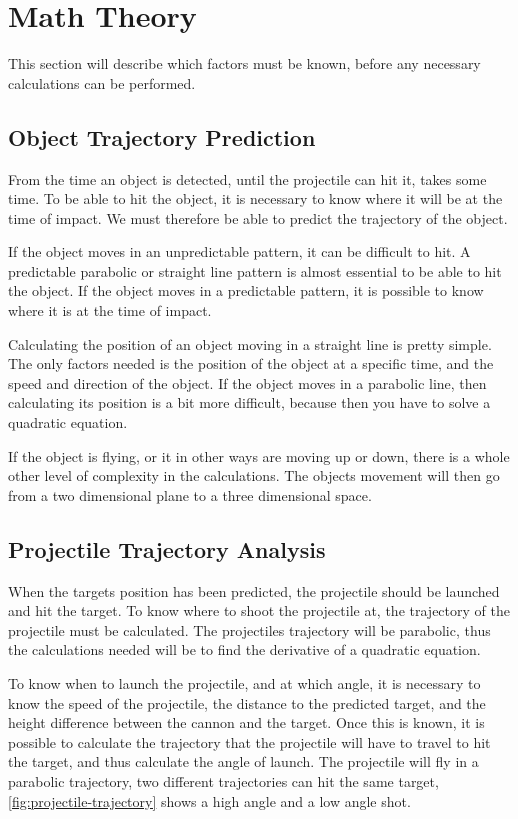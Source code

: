 \section{Math Theory}
This section will describe which factors must be known, before any necessary calculations can be performed.

\subsection{Object Trajectory Prediction}
From the time an object is detected, until the projectile can hit it, takes some time. To be able to hit the object, it is necessary to know where it will be at the time of impact. We must therefore be able to predict the trajectory of the object.

If the object moves in an unpredictable pattern, it can be difficult to hit. A predictable parabolic or straight line pattern is almost essential to be able to hit the object. If the object moves in a predictable pattern, it is possible to know where it is at the time of impact.

Calculating the position of an object moving in a straight line is pretty simple. The only factors needed is the position of the object at a specific time, and the speed and direction of the object. If the object moves in a parabolic line, then calculating its position is a bit more difficult, because then you have to solve a quadratic equation.

If the object is flying, or it in other ways are moving up or down, there is a whole other level of complexity in the calculations. The objects movement will then go from a two dimensional plane to a three dimensional space.

\subsection{Projectile Trajectory Analysis}
When the targets position has been predicted, the projectile should be launched and hit the target. To know where to shoot the projectile at, the trajectory of the projectile must be calculated.
The projectiles trajectory will be parabolic\cite{trajectoryanalysis}, thus the calculations needed will be to find the derivative of a quadratic equation.

To know when to launch the projectile, and at which angle, it is necessary to know the speed of the projectile, the distance to the predicted target, and the height difference between the cannon and the target. Once this is known, it is possible to calculate the trajectory that the projectile will have to travel to hit the target, and thus calculate the angle of launch. The projectile will fly in a parabolic trajectory, two different trajectories can hit the same target, \autoref{fig:projectile-trajectory} shows a high angle and a low angle shot.

